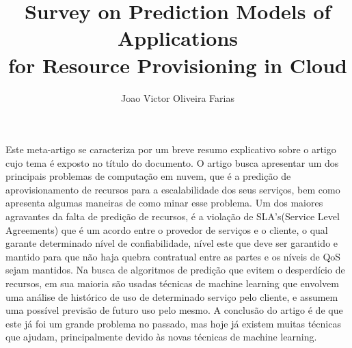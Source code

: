 \documentclass[12pt]{article}
\title{Survey on Prediction Models of Applications\\
 for Resource Provisioning in Cloud}
\author{Joao Victor Oliveira Farias}
\begin{document}
 

\maketitle

\begin{abstract}
  
\end{abstract}
     
\begin{resumo} 
  \cite{amiri2017survey}
  Este meta-artigo se caracteriza por um breve resumo explicativo sobre o artigo cujo tema é exposto no título do documento. O artigo busca apresentar um dos principais problemas de computação em nuvem, que é a predição de aprovisionamento de recursos para a escalabilidade dos seus serviços, bem como apresenta algumas maneiras de como minar esse problema. Um dos maiores agravantes da falta de predição de recursos, é a violação de SLA's(Service Level Agreements) que é um acordo entre o provedor de serviços e o cliente, o qual garante determinado nível de confiabilidade, nível este que deve ser garantido e mantido para que não haja quebra contratual entre as partes e os níveis de QoS sejam mantidos. Na busca de algoritmos de predição que evitem o desperdício de recursos, em sua maioria são usadas técnicas de machine learning que envolvem uma análise de histórico de uso de determinado serviço pelo cliente, e assumem uma possível previsão de futuro uso pelo mesmo. A conclusão do artigo é de que este já foi um grande problema no passado, mas hoje já existem muitas técnicas que ajudam, principalmente devido às novas técnicas de machine learning.
\end{resumo}




\end{document}
